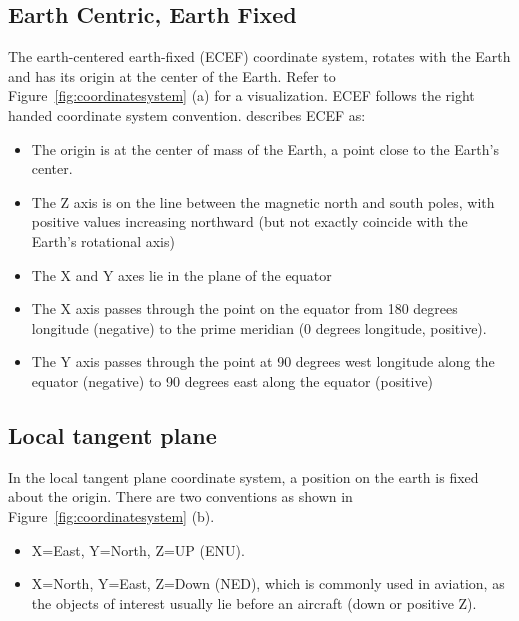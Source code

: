 \subsection{Earth Centric, Earth Fixed}

The earth-centered earth-fixed (ECEF) coordinate system, rotates with the Earth and has its origin at the center of the Earth. Refer to Figure~\ref{fig:coordinatesystem} (a) for a visualization. ECEF follows the right handed coordinate system convention.  describes ECEF as:

\begin{itemize}
	\item The origin is at the center of mass of the Earth, a point close to the Earth's center.
	\item The Z axis is on the line between the magnetic north and south poles, with positive values increasing northward (but not exactly coincide with the Earth's rotational axis)
	\item The X and Y axes lie in the plane of the equator
	\item The X axis passes through the point on the equator from 180 degrees longitude (negative) to the prime meridian (0 degrees longitude, positive).
	\item The Y axis passes through the point at 90 degrees west longitude along the equator (negative) to 90 degrees east along the equator (positive)
\end{itemize}

\subsection{Local tangent plane}

In the local tangent plane coordinate system, a position on the earth is fixed about the origin. There are two conventions as shown in Figure~\ref{fig:coordinatesystem} (b).

\begin{itemize}
	\item X=East, Y=North, Z=UP (ENU).
	\item X=North, Y=East, Z=Down (NED), which is commonly used in aviation, as the objects of interest usually lie before an aircraft (down or positive Z).
\end{itemize}

